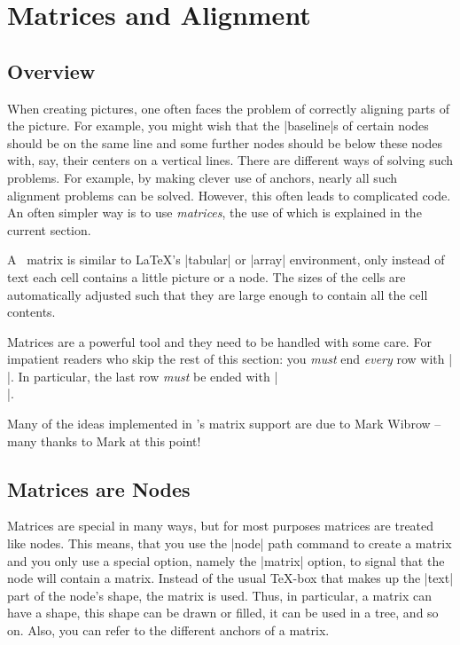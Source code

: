 %
%
%

\section{Matrices and Alignment}

\label{section-matrices}

\subsection{Overview}

When creating pictures, one often faces the problem of correctly
aligning parts of the picture. For example, you might wish that the
|baseline|s of certain nodes should be on the same line and some
further nodes should be below these nodes with, say, their centers on
a vertical lines. There are different ways of solving such
problems. For example, by making clever use of anchors, nearly all
such alignment problems can be solved. However, this often leads to
complicated code. An often simpler way is to use \emph{matrices},
the use of which is explained in the current section.

A \tikzname\ matrix is similar to \LaTeX's |{tabular}| or
|{array}| environment, only instead of text each cell contains a
little picture or a node. The sizes of the cells are automatically
adjusted such that they are large enough to contain all the cell
contents.

Matrices are a powerful tool and they need to be handled with some care.
For impatient readers who skip the rest of this section: you
\emph{must} end \emph{every} row with |\\|. In particular, the last
row \emph{must} be ended with |\\|.

Many of the ideas implemented in \tikzname's matrix support are due to
Mark Wibrow -- many thanks to Mark at this point!



\subsection{Matrices are Nodes}

Matrices are special in many ways, but for most purposes matrices are
treated like nodes. This means, that you use the |node| path command
to create a matrix and you only use a special option, namely the
|matrix| option, to signal that the node will contain a
matrix. Instead of the usual \TeX-box that makes up the |text| part of
the node's shape, the matrix is used. Thus, in particular, a matrix
can have a shape, this shape can be drawn or filled, it can be used in
a tree, and so on. Also, you can refer to the different anchors of a
matrix.

